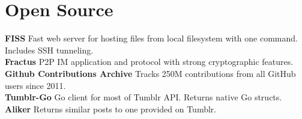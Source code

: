 \documentclass[]{friggeri-cv} %
\begin{document}
\section{Open Source}

\textbf{FISS} Fast web server for hosting files from local filesystem with one command. Includes SSH tunneling.
\\
\textbf{Fractus} P2P IM application and protocol with strong cryptographic features.
\\
\textbf{Github Contributions Archive} Tracks 250M contributions from all GitHub users since 2011.
\\
\textbf{Tumblr-Go} Go client for most of Tumblr API. Returns native Go structs.
\\
\textbf{Aliker} Returns similar posts to one provided on Tumblr.
\\




\end{document}
